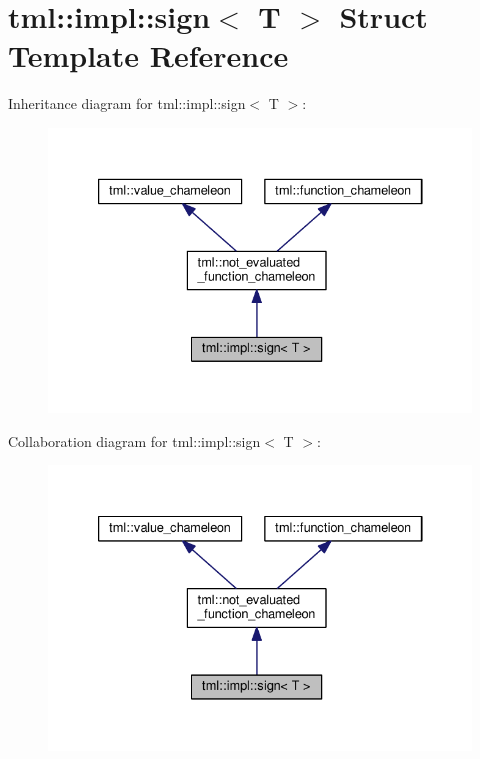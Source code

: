 \hypertarget{structtml_1_1impl_1_1sign}{\section{tml\+:\+:impl\+:\+:sign$<$ T $>$ Struct Template Reference}
\label{structtml_1_1impl_1_1sign}
}


Inheritance diagram for tml\+:\+:impl\+:\+:sign$<$ T $>$\+:
\nopagebreak
\begin{figure}[H]
\begin{center}
\leavevmode
\includegraphics[width=333pt]{structtml_1_1impl_1_1sign__inherit__graph}
\end{center}
\end{figure}


Collaboration diagram for tml\+:\+:impl\+:\+:sign$<$ T $>$\+:
\nopagebreak
\begin{figure}[H]
\begin{center}
\leavevmode
\includegraphics[width=333pt]{structtml_1_1impl_1_1sign__coll__graph}
\end{center}
\end{figure}
